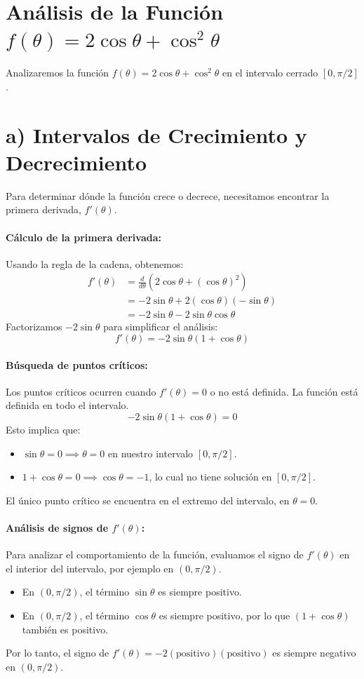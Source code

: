 \documentclass[12pt, letterpaper]{article}
\begin{document}
\section*{Análisis de la Función $f(\theta) = 2\cos\theta + \cos^2\theta$}
Analizaremos la función $f(\theta) = 2\cos\theta + \cos^2\theta$ en el intervalo cerrado $[0, \pi/2]$.

\section*{a) Intervalos de Crecimiento y Decrecimiento}

Para determinar dónde la función crece o decrece, necesitamos encontrar la primera derivada, $f'(\theta)$.

\paragraph{Cálculo de la primera derivada:}
Usando la regla de la cadena, obtenemos:
\begin{align*}
f'(\theta) &= \frac{d}{d\theta}(2\cos\theta + (\cos\theta)^2) \\
&= -2\sin\theta + 2(\cos\theta)(-\sin\theta) \\
&= -2\sin\theta - 2\sin\theta\cos\theta
\end{align*}
Factorizamos $-2\sin\theta$ para simplificar el análisis:
$$ f'(\theta) = -2\sin\theta(1 + \cos\theta) $$

\paragraph{Búsqueda de puntos críticos:}
Los puntos críticos ocurren cuando $f'(\theta) = 0$ o no está definida. La función está definida en todo el intervalo.
$$ -2\sin\theta(1 + \cos\theta) = 0 $$
Esto implica que:
\begin{itemize}
    \item $\sin\theta = 0 \implies \theta = 0$ en nuestro intervalo $[0, \pi/2]$.
    \item $1 + \cos\theta = 0 \implies \cos\theta = -1$, lo cual no tiene solución en $[0, \pi/2]$.
\end{itemize}
El único punto crítico se encuentra en el extremo del intervalo, en $\theta = 0$.

\paragraph{Análisis de signos de $f'(\theta)$:}
Para analizar el comportamiento de la función, evaluamos el signo de $f'(\theta)$ en el interior del intervalo, por ejemplo en $(0, \pi/2)$.
\begin{itemize}
    \item En $(0, \pi/2)$, el término $\sin\theta$ es siempre positivo.
    \item En $(0, \pi/2)$, el término $\cos\theta$ es siempre positivo, por lo que $(1 + \cos\theta)$ también es positivo.
\end{itemize}
Por lo tanto, el signo de $f'(\theta) = -2(\text{positivo})(\text{positivo})$ es siempre negativo en $(0, \pi/2)$.
\end{document}
